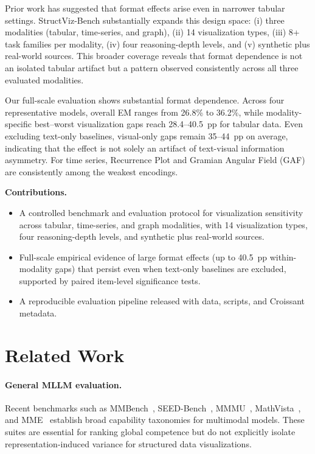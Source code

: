 \documentclass{article}
\begin{document}
Prior work has suggested that format effects arise even in narrower tabular settings. StructViz-Bench substantially expands this design space: (i) three modalities (tabular, time-series, and graph), (ii) 14 visualization types, (iii) 8+ task families per modality, (iv) four reasoning-depth levels, and (v) synthetic plus real-world sources. This broader coverage reveals that format dependence is not an isolated tabular artifact but a pattern observed consistently across all three evaluated modalities.

Our full-scale evaluation shows substantial format dependence. Across four representative models, overall EM ranges from 26.8\% to 36.2\%, while modality-specific best--worst visualization gaps reach 28.4--40.5~pp for tabular data. Even excluding text-only baselines, visual-only gaps remain 35--44~pp on average, indicating that the effect is not solely an artifact of text-visual information asymmetry. For time series, Recurrence Plot and Gramian Angular Field (GAF) are consistently among the weakest encodings.

\textbf{Contributions.}
\begin{itemize}[leftmargin=1.5em]
    \item A controlled benchmark and evaluation protocol for visualization sensitivity across tabular, time-series, and graph modalities, with 14 visualization types, four reasoning-depth levels, and synthetic plus real-world sources.
    \item Full-scale empirical evidence of large format effects (up to 40.5~pp within-modality gaps) that persist even when text-only baselines are excluded, supported by paired item-level significance tests.
    \item A reproducible evaluation pipeline released with data, scripts, and Croissant metadata.
\end{itemize}

\section{Related Work}
\paragraph{General MLLM evaluation.}
Recent benchmarks such as MMBench~\citep{liu2024mmbench}, SEED-Bench~\citep{li2024seedbench}, MMMU~\citep{yue2024mmmu}, MathVista~\citep{lu2023mathvista}, and MME~\citep{fu2023mme} establish broad capability taxonomies for multimodal models. These suites are essential for ranking global competence but do not explicitly isolate representation-induced variance for structured data visualizations.
\end{document}

